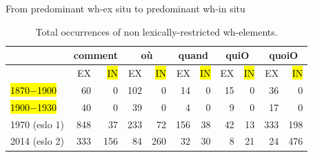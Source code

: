 \documentclass[lesson_slides]{subfiles}
\begin{document}
\begin{frame}[c]{From predominant wh-ex situ to predominant wh-in situ}

\begin{table}[H]
    \centering
    \small
    \begin{adjustbox}
        \begin{tabular}{l|rr|rr|rr|rr|rr}
        {} & \multicolumn{2}{c}{comment}  & \multicolumn{2}{c}{où} & \multicolumn{2}{c}{quand} & \multicolumn{2}{c}{quiO}& \multicolumn{2}{c}{quoiO}\\
        \hline
        {} & EX & \hl{IN} & EX & \hl{IN} & EX & \hl{IN} & EX & \hl{IN} & EX & \hl{IN}\\
        \hl{1870$-$1900} & 60 & 0 & 102 & 0 & 14 & 0 & 15 & 0 & 36 & 0\\
        \hl{1900$-$1930} & 40 & 0 & 39 & 0 & 4 & 0 & 9 & 0 & 17 & 0\\
        1970 (eslo 1) & 848 & 37 & 233 & 72 & 156 & 38 & 42 & 13 & 333 & 198\\
        2014 (eslo 2) & 333 & 156 & 84 & 260 & 32 & 30 & 8 & 21 & 24 & 476 \\
        \hline
        \end{tabular}
    \end{adjustbox}
\caption{\label{tab:samp3}Total occurrences of non lexically-restricted wh-elements.}
\end{table}
  
\end{frame}
\end{document}
